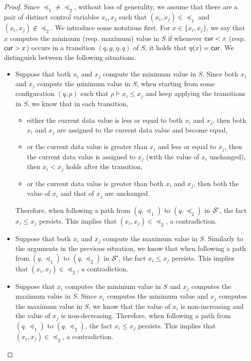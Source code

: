 \begin{appendix}
\begin{proof}
Since $\preceq_1 \neq \preceq_2$, without loss of generality, we assume that there are a pair of distinct control variables $x_i, x_j$ such that $(x_i, x_j) \in \preceq_1$ and $(x_i, x_j) \not \in \preceq_2$. 
We introduce some notations first. For $x \in \{x_i, x_j\}$, we say that $x$ computes the minimum (resp. maximum) value in $S$ if whenever $\mathsf{cur} < x$ (resp. $\mathsf{cur} > x$) occurs in a transition $(q, g, \eta, q)$ of $S$, it holds that $\eta(x)=\mathsf{cur}$. 
We distinguish between the following situations.
\begin{itemize}
\item Suppose that both $x_i$ and $x_j$ compute the minimum value in $S$. Since both $x_i$ and $x_j$ compute the minimum value in $S$, when starting from some configuration $(q, \rho)$ such that $\rho \models x_i \le x_j$ and keep applying the transitions in $S$, we know that in each transition, 
\begin{itemize}
\item either the current data value is less or equal to both $x_i$ and $x_j$, then both $x_i$ and $x_j$ are assigned to the current data value and become equal, 
%
\item or the current data value is greater than $x_i$ and less or equal to $x_j$, then the current data value is assigned to $x_j$ (with the value of $x_i$ unchanged), then $x_i < x_j$ holds after the transition,
%
\item or the current data value is greater than both $x_i$ and $x_j$, then both the value of $x_i$ and that of $x_j$ are unchanged.
\end{itemize}
Therefore, when following a path from $(q, \preceq_1)$ to $(q, \preceq_2)$ in ${\mathcal{S} }'$, the fact $x_i \le x_j$ persists. This implies that $(x_i, x_j) \in \preceq_2$, a contradiction.
%
\item Suppose that both $x_i$ and $x_j$ compute the maximum value in $S$. Similarly to the arguments in the previous situation, we know that when following a path from $(q, \preceq_1)$ to $(q, \preceq_2)$ in ${\mathcal{S} }'$, the fact $x_i \le x_j$ persists. This implies that $(x_i, x_j) \in \preceq_2$, a contradiction.
%
\item Suppose that $x_i$ computes the minimum value in $S$ and $x_j$ computes the maximum value in $S$. Since $x_i$ computes the minimum value and $x_j$ computes the maximum value in $S$, we know that the value of $x_i$ is non-increasing and the value of $x_j$ is non-decreasing. Therefore, when following a path from $(q, \preceq_1)$ to $(q, \preceq_2)$, the fact $x_i \le x_j$ persists. This implies that $(x_i, x_j) \in \preceq_2$, a contradiction.

\end{itemize}
\end{proof}
\end{appendix}
